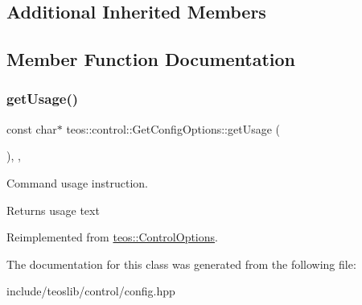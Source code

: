 \subsection*{Additional Inherited Members}


\subsection{Member Function Documentation}
\mbox{\label{classteos_1_1control_1_1_get_config_options_a144b88309b989f2282da43ad56ddb1a6}} 
\subsubsection{\texorpdfstring{get\+Usage()}{getUsage()}}
{\footnotesize\ttfamily const char$\ast$ teos\+::control\+::\+Get\+Config\+Options\+::get\+Usage (\begin{DoxyParamCaption}{ }\end{DoxyParamCaption})\hspace{0.3cm}{\ttfamily [inline]}, {\ttfamily [protected]}, {\ttfamily [virtual]}}



Command \textquotesingle{}usage\textquotesingle{} instruction. 

\begin{DoxyReturn}{Returns}
usage text 
\end{DoxyReturn}


Reimplemented from \mbox{\hyperlink{classteos_1_1_control_options_a0aa5671f9bc750ed5280c26c543874f3}{teos\+::\+Control\+Options}}.



The documentation for this class was generated from the following file\+:\begin{DoxyCompactItemize}
\item 
include/teoslib/control/config.\+hpp\end{DoxyCompactItemize}
